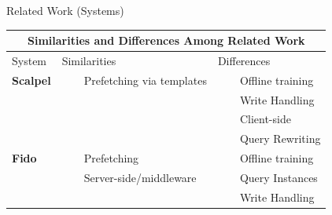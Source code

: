 \documentclass[10pt]{beamer}
\newcommand{\tabitem}{~~\llap{\textbullet}~~}
\begin{document}
\begin{frame}[fragile]{Related Work (Systems)}
\begin{table}
\centering
\begin{tabular}{lll}
\multicolumn{3}{c}{Similarities and Differences Among Related Work} \\
\toprule
System & Similarities & Differences \\
\midrule
\textbf{Scalpel} & \multicolumn{1}{p{5cm}}{\tabitem{Prefetching via templates}} & \tabitem{Offline training}  \\
& & \tabitem{Write Handling} \\
& & \tabitem{Client-side} \\
& & \tabitem{Query Rewriting} \\
\midrule
\textbf{Fido} & \tabitem{Prefetching} & \tabitem{Offline training} \\
& \tabitem{Server-side/middleware} & \tabitem{Query Instances} \\
& & \tabitem{Write Handling} \\
\midrule
\end{tabular}
\end{table}
\end{frame}

\begin{frame}[allowframebreaks]
    
    
\end{frame}
\end{document}
